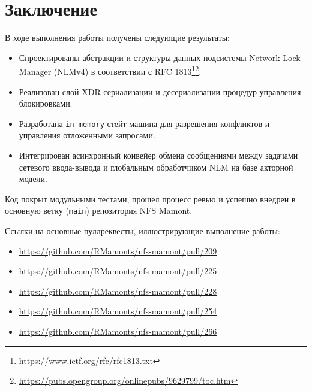 \documentclass[a4paper]{article}
\begin{document}
\section{Заключение}

В ходе выполнения работы получены следующие результаты:
\begin{itemize}
    \item Спроектированы абстракции и структуры данных подсистемы Network Lock Manager (NLMv4) в соответствии с RFC 1813\footnote{\url{https://www.ietf.org/rfc/rfc1813.txt}}\footnote{\url{https://pubs.opengroup.org/onlinepubs/9629799/toc.htm}}.
    \item Реализован слой XDR-сериализации и десериализации процедур управления блокировками.
    \item Разработана \texttt{in-memory} стейт-машина для разрешения конфликтов и управления отложенными запросами.
    \item Интегрирован асинхронный конвейер обмена сообщениями между задачами сетевого ввода-вывода и глобальным обработчиком NLM на базе акторной модели.
\end{itemize}

Код покрыт модульными тестами, прошел процесс ревью и успешно внедрен в основную ветку (\texttt{main}) репозитория NFS Mamont.

Ссылки на основные пуллреквесты, иллюстрирующие выполнение работы:
\begin{itemize}
    \item \url{https://github.com/RMamonts/nfs-mamont/pull/209}
    \item \url{https://github.com/RMamonts/nfs-mamont/pull/225}
    \item \url{https://github.com/RMamonts/nfs-mamont/pull/228}
    \item \url{https://github.com/RMamonts/nfs-mamont/pull/254}
    \item \url{https://github.com/RMamonts/nfs-mamont/pull/266}
\end{itemize}
\end{document}
